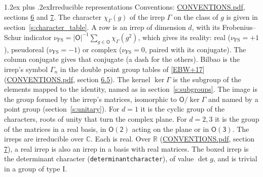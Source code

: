 \documentclass[10pt,a4paper]{article}
\makeatletter
\renewcommand\section{\@startsection{section}{1}{\z@}{-3ex plus -1ex minus -.2ex}%
  {1.2ex plus .2ex}{\normalfont\large\sffamily\bfseries\color{parttitle}}}
\numberwithin{equation}{section}
\newcommand{\grp}[1]{\mathsf{#1}}
\newcommand{\irchar}[1]{\chi_{#1}}
\newcommand{\fsind}{\nu_{\mathrm{FS}}}
\makeatother
\begin{document}
\section{Irreducible representations}\label{s:irreps}
Conventions: \href{../../CONVENTIONS.pdf}{CONVENTIONS.pdf}, sections \href{../../CONVENTIONS.pdf\#conv.6}{6} and \href{../../CONVENTIONS.pdf\#conv.7}{7}.
\leavevmode\label{n:function.character}\label{n:irrep.Gamma}The character $\irchar{\Gamma}(g)$ of the irrep $\Gamma$ on the class of $g$ is given in section~\ref{s:character_table}.
\leavevmode\label{n:index.dimension}\label{n:index.frobenius}\label{n:head.irrep}\label{n:head.reality}A row is an irrep of dimension $d$, with its Frobenius--Schur indicator $\fsind = |\grp{O}|^{-1}\allowbreak\sum_{g\in\grp{O}}\irchar{\Gamma}(g^2)$, which gives its reality: real ($\fsind = +1$), pseudoreal ($\fsind = -1$) or complex ($\fsind = 0$, paired with its conjugate). \label{n:head.conjugate}The column conjugate gives that conjugate (a dash for the others). \label{n:head.bilbao}\label{n:irrep.alias.gamma}Bilbao is the irrep's symbol $\Gamma_n$ in the double point group tables of [\href{../../../REFERENCES.pdf\#ref.EBW+17}{EBW+17}] (\href{../../CONVENTIONS.pdf}{CONVENTIONS.pdf}, section \href{../../CONVENTIONS.pdf\#conv.6.5}{6.5}). \label{n:head.kernel}The kernel $\ker\Gamma$ is the subgroup of the elements mapped to the identity, named as in section~\ref{s:subgroups}. \label{n:head.image}The image is the group formed by the irrep's matrices, isomorphic to $\grp{O}/\ker\Gamma$ and named by a point group (section~\ref{s:unitary}). For $d = 1$ it is the cyclic group of the characters, roots of unity that turn the complex plane. For $d = 2, 3$ it is the group of the matrices in a real basis, in $\grp{O(2)}$ acting on the plane or in \href{O3.pdf}{$\grp{O(3)}$}. The irreps are irreducible over $\mathbb{C}$. Each is real. Over $\mathbb{R}$ (\href{../../CONVENTIONS.pdf}{CONVENTIONS.pdf}, section \href{../../CONVENTIONS.pdf\#conv.7}{7}), a real irrep is also an irrep in a basis with real matrices. \label{n:mark.determinant}The boxed irrep is the determinant character (\texttt{determinantcharacter}), of value $\det g$, and is trivial in a group of type I.
\setlength{\emergencystretch}{2em}\par\setlength{\emergencystretch}{0pt}
\end{document}
